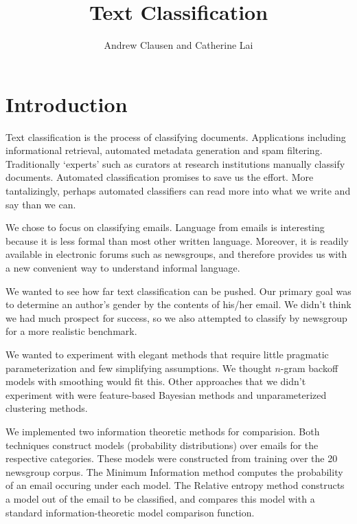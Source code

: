\documentclass[a4]{article}
\author{Andrew Clausen and Catherine Lai}
\title{Text Classification}
\begin{document}
\maketitle

\section{Introduction}

Text classification is the process of classifying documents.  Applications
including informational retrieval, automated metadata generation and spam
filtering.  Traditionally `experts' such as curators at research institutions
manually classify documents.  Automated classification promises to save us the
effort.  More tantalizingly, perhaps automated classifiers can read more into
what we write and say than we can.

We chose to focus on classifying emails.  Language from emails is interesting
because it is less formal than most other written language.  Moreover, it is
readily available in electronic forums such as newsgroups, and therefore
provides us with a new convenient way to understand informal language.

We wanted to see how far text classification can be pushed.
Our primary goal was to determine an author's gender by the contents of
his/her email.  We didn't think we had much prospect for success, so we
also attempted to classify by newsgroup for a more realistic benchmark.

We wanted to experiment with elegant methods that require little pragmatic
parameterization and few simplifying assumptions.  We thought $n$-gram backoff
models with smoothing would fit this.  Other approaches that we didn't
experiment with were feature-based Bayesian methods and unparameterized
clustering methods.

We implemented two information theoretic methods for comparision.  Both
techniques construct models (probability distributions) over emails for the
respective categories.  These models were constructed from training over the
20 newsgroup corpus.  The Minimum Information method computes the probability
of an email occuring under each model.  The Relative entropy method constructs
a model out of the email to be classified, and compares this model with a
standard information-theoretic model comparison function.
\end{document}
